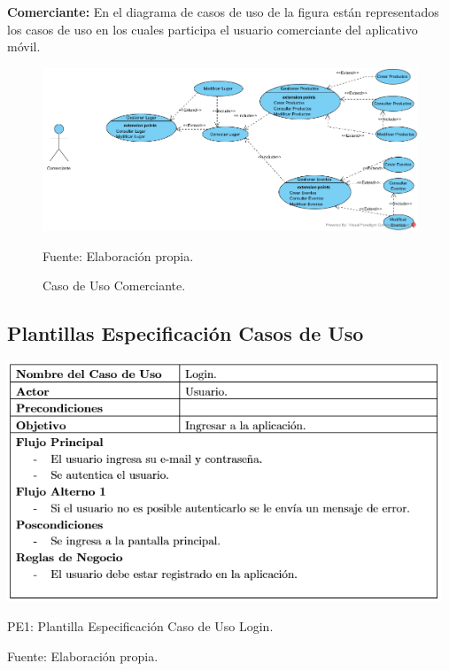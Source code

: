 \documentclass[12pt,letterpaper,openany]{book}
\begin{document}
\textbf{Comerciante:} En el diagrama de casos de uso de la figura están representados los casos de uso en los cuales participa el usuario comerciante del aplicativo móvil.
\begin{figure}[H]
\begin{center}
\includegraphics[width=13cm]{./imagenes/CU/cu_comerciante}
\caption{Caso de Uso Comerciante.}
\centering Fuente: Elaboración propia.
\end{center}
\end{figure}

\subsection{Plantillas Especificación Casos de Uso}
\begin{table}[H]
\centering
\includegraphics[width=13cm]{./imagenes/PCU/login}
\caption{PE1: Plantilla Especificación Caso de Uso Login.}
\centering Fuente: Elaboración propia.
\end{table}
\end{document}
